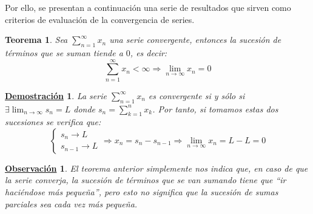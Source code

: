 \documentclass[10pt,a4paper,openright]{book}
\theoremstyle{break}
\newtheorem{theo}{Teorema}[chapter]
\newtheorem*{demo}{\underline{Demostración}}
\newtheorem{obs}{\underline{Observación}}[chapter]
\begin{document}
Por ello, se presentan a continuación una serie de resultados que sirven como criterios de evaluación de la convergencia de series.

\begin{theo}
Sea $\sum_{n=1}^\infty x_n$ una serie convergente, entonces la sucesión de términos que se suman tiende a $0$, es decir:
$$\sum_{n=1}^{\infty} x_n <\infty \Rightarrow \lim_{n \rightarrow \infty} x_n =0$$
\end{theo}
\begin{demo}
La serie $\sum_{n=1}^{\infty} x_n$ es convergente si y sólo si $\exists \lim_{n \to \infty} s_n = L$ donde $s_n = \sum_{k=1}^{n} x_k$. Por tanto, si tomamos estas dos sucesiones se verifica que:
$$
\begin{cases}
s_n \rightarrow L \\
s_{n-1} \rightarrow L
\end{cases}
\Rightarrow x_n = s_n - s_{n-1} \Rightarrow \lim_{n\rightarrow\infty} x_n = L - L = 0
$$
\end{demo}

\begin{obs}
El teorema anterior simplemente nos indica que, en caso de que la serie converja, la sucesión de términos que se van sumando tiene que ``ir haciéndose más pequeña'', pero esto no significa que la sucesión de sumas parciales sea cada vez más pequeña.
\end{obs}
\end{document}
